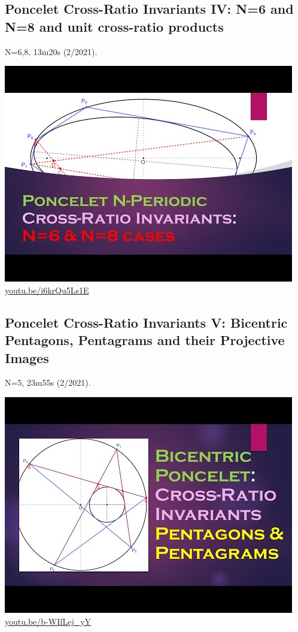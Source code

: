 \documentclass[12pt]{amsart}
\begin{document}
\subsection{Poncelet Cross-Ratio Invariants IV: N=6 and N=8 and unit cross-ratio products}
\label{vid:i6krQu5Ls1E}
\noindent N=6,8, 13m20s (2/2021). 
\begin{center}\includegraphics[width=.5\textwidth]{pics/i6krQu5Ls1E.jpg} \\ 
\href{https://youtu.be/i6krQu5Ls1E}{\url{youtu.be/i6krQu5Ls1E}}\end{center}
% 
\subsection{Poncelet Cross-Ratio Invariants V: Bicentric Pentagons, Pentagrams and their Projective Images}
\label{vid:b-WIfLej_yY}
\noindent N=5, 23m55s (2/2021). 
\begin{center}\includegraphics[width=.5\textwidth]{pics/b-WIfLej_yY.jpg} \\ 
\href{https://youtu.be/b-WIfLej_yY}{\url{youtu.be/b-WIfLej\_yY}}\end{center}
% 
\end{document}
